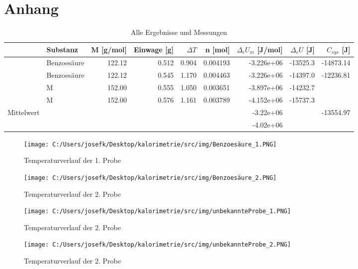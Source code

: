 \section{Anhang}

\begin{table}[H]
	\centering
	\begin{tabular}{llrrrrrrr}
		\toprule
		{}         & Substanz    & M [g/mol] & Einwage [g] & $\Delta T$ & n [mol]  & $\Delta _c U_m$ [J/mol] & $\Delta _c U$ [J] & $C_{sys}$ [J] \\
		\midrule
		           & Benzoesäure & 122.12    & 0.512       & 0.904      & 0.004193 & -3.226e+06              & -13525.3          & -14873.14     \\
		           & Benzoesäure & 122.12    & 0.545       & 1.170      & 0.004463 & -3.226e+06              & -14397.0          & -12236.81     \\
		           & M           & 152.00    & 0.555       & 1.050      & 0.003651 & -3.897e+06              & -14232.7          &               \\
		           & M           & 152.00    & 0.576       & 1.161      & 0.003789 & -4.152e+06              & -15737.3          &               \\
		\midrule
		Mittelwert &             &           &             &            &          & -3.22e+06               &                   & -13554.97     \\
		           &             &           &             &            &          & -4.02e+06               &                   &               \\
		\bottomrule
  \end{tabular}
  \caption{Alle Ergebnisse und Messungen}
\end{table}

\begin{figure}[H]
	\texttt{[image: C:/Users/josefk/Desktop/kalorimetrie/src/img/Benzoesäure\_1.PNG]}
	\caption{Temperaturverlauf der 1. Probe}
\end{figure}

\begin{figure}[H]
	\texttt{[image: C:/Users/josefk/Desktop/kalorimetrie/src/img/Benzoesäure\_2.PNG]}
	\caption{Temperaturverlauf der 2. Probe}
\end{figure}

\begin{figure}[H]
	\texttt{[image: C:/Users/josefk/Desktop/kalorimetrie/src/img/unbekannteProbe\_1.PNG]}
	\caption{Temperaturverlauf der 2. Probe}
\end{figure}

\begin{figure}[H]
	\texttt{[image: C:/Users/josefk/Desktop/kalorimetrie/src/img/unbekannteProbe\_2.PNG]}
	\caption{Temperaturverlauf der 2. Probe}
\end{figure}
